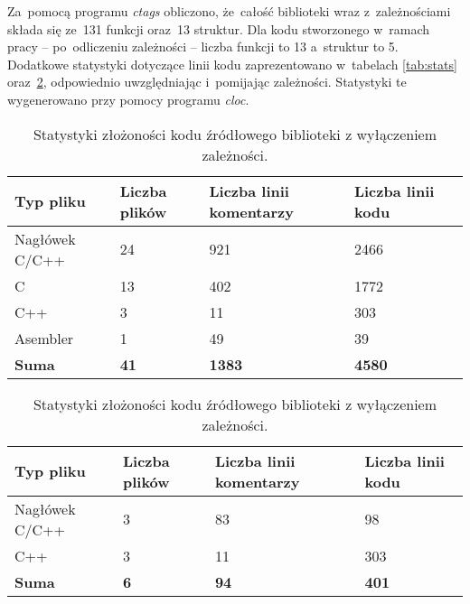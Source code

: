 Za~pomocą programu \emph{ctags} obliczono, że~całość biblioteki wraz z~zależnościami składa się ze~131 funkcji oraz~13 struktur. Dla kodu stworzonego w~ramach pracy -- po~odliczeniu zależności -- liczba funkcji to 13 a~struktur to 5. Dodatkowe statystyki dotyczące linii kodu zaprezentowano w~tabelach \ref{tab:stats} oraz~\ref{tab:statssmall}, odpowiednio uwzględniając i~pomijając zależności. Statystyki te wygenerowano przy pomocy programu \emph{cloc}.

\begin{table}[ht]
\centering
\caption{Statystyki złożoności kodu źródłowego}
\begin{subtable}{\textwidth}
    \centering
\begin{tabular}{|l|l|l|l|l|}
    \hline
    \textbf{Typ pliku}  &
    \textbf{Liczba plików}  &
    \textbf{Liczba linii komentarzy}  &
    \textbf{Liczba linii kodu} \\
    \hline
    Nagłówek C/C++ & 24 & 921 & 2466 \\
    \hline
    C & 13 & 402 & 1772 \\
    \hline
    C++ & 3 & 11 & 303 \\
    \hline
    Asembler & 1 & 49 & 39 \\
    \hline
    \hline
    \textbf{Suma} &
    \textbf{41} &
    \textbf{1383} &
    \textbf{4580} \\
    \hline
\end{tabular}
\caption{Statystyki złożoności kodu źródłowego biblioteki wraz z zależnościami.}
\label{tab:stats}
\end{subtable}

\begin{subtable}{\textwidth}
    \centering
\begin{tabular}{|l|l|l|l|}
    \hline
    \textbf{Typ pliku}  &
    \textbf{Liczba plików}  &
    \textbf{Liczba linii komentarzy}  &
    \textbf{Liczba linii kodu} \\
    \hline
    Nagłówek C/C++ & 3 & 83 & 98 \\
    \hline
    C++ & 3 & 11 & 303 \\
    \hline
    \hline
    \textbf{Suma} &
    \textbf{6} &
    \textbf{94} &
    \textbf{401} \\
    \hline
\end{tabular}
\caption{Statystyki złożoności kodu źródłowego biblioteki z wyłączeniem \mbox{zależności}.}
\label{tab:statssmall}
\end{subtable}
\end{table}

